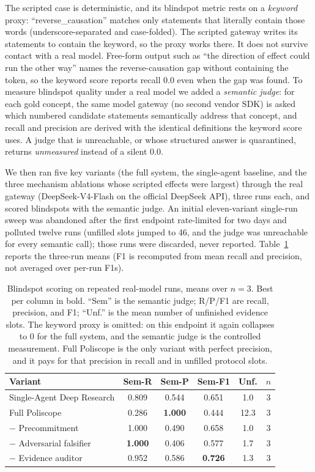 The scripted case is deterministic, and its blindspot metric rests on a
\emph{keyword} proxy: ``reverse\_causation'' matches only statements that
literally contain those words (underscore-separated and case-folded). The
scripted gateway writes its statements to contain the keyword, so the proxy
works there. It does not survive contact with a real model. Free-form output
such as ``the direction of effect could run the other way'' names the
reverse-causation gap without containing the token, so the keyword score
reports recall 0.0 even when the gap was found. To measure blindspot quality
under a real model we added a \emph{semantic judge}: for each gold concept,
the same model gateway (no second vendor SDK) is asked which numbered
candidate statements semantically address that concept, and recall and
precision are derived with the identical definitions the keyword score uses.
A judge that is unreachable, or whose structured answer is quarantined,
returns \emph{unmeasured} instead of a silent 0.0.

We then ran five key variants (the full system, the single-agent baseline,
and the three mechanism ablations whose scripted effects were largest)
through the real gateway (DeepSeek-V4-Flash on the official DeepSeek API),
three runs each, and scored blindspots with the semantic judge. An initial
eleven-variant single-run sweep was abandoned after the first endpoint
rate-limited for two days and polluted twelve runs (unfilled slots jumped to
46, and the judge was unreachable for every semantic call); those runs were
discarded, never reported. Table~\ref{tab:real} reports the three-run
means (F1 is recomputed from mean recall and precision, not averaged over
per-run F1s).

\begin{table}[t]
\centering
\small
\begin{tabular}{@{}lccccc@{}}
\toprule
\textbf{Variant} & \textbf{Sem-R} & \textbf{Sem-P} & \textbf{Sem-F1} & \textbf{Unf.} & \textbf{$n$} \\
\midrule
Single-Agent Deep Research & 0.809 & 0.544 & 0.651 & 1.0 & 3 \\
Full Poliscope & 0.286 & \textbf{1.000} & 0.444 & 12.3 & 3 \\
\quad$-$ Precommitment & 1.000 & 0.490 & 0.658 & 1.0 & 3 \\
\quad$-$ Adversarial falsifier & \textbf{1.000} & 0.406 & 0.577 & 1.7 & 3 \\
\quad$-$ Evidence auditor & 0.952 & 0.586 & \textbf{0.726} & 1.3 & 3 \\
\bottomrule
\end{tabular}
\caption{Blindspot scoring on repeated real-model runs, means over $n=3$.
Best per column in bold. ``Sem'' is the semantic judge; R/P/F1 are recall,
precision, and F1; ``Unf.'' is the mean number of unfinished evidence
slots. The keyword proxy is omitted: on this endpoint it again collapses to
0 for the full system, and the semantic judge is the controlled measurement.
Full Poliscope is the only variant with perfect precision, and it pays for
that precision in recall and in unfilled protocol slots.}
\label{tab:real}
\end{table}

